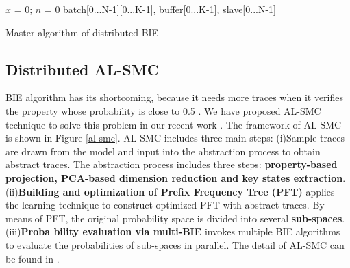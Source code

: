 \begin{algorithm}[t]
{}
$x$ = 0; $n$ = 0\;
batch[0...N-1][0...K-1], buffer[0...K-1], slave[0...N-1]\;
\caption{Master algorithm of distributed BIE}
\label{alg:dbeam}
\end{algorithm}


\subsection{Distributed AL-SMC}
BIE algorithm has its shortcoming, because it needs more traces when it verifies the property whose probability is close to 0.5 \cite{zuliani2013bayesian}. We have proposed AL-SMC technique to solve this problem in our recent work \cite{jiangkaiqiang2016}. The framework of AL-SMC is shown in Figure \ref{al-smc}. AL-SMC includes three main steps: (i)Sample traces are drawn from the model and input into the abstraction process to obtain abstract traces. The abstraction process includes three steps: \textbf{property-based projection, PCA-based dimension reduction \cite{dunteman1989principal} and key states extraction}. (ii)\textbf{Building and optimization of Prefix Frequency Tree (PFT)} applies the learning technique \cite{carrasco1994learning} to construct optimized PFT with abstract traces. By means of PFT, the original probability space is divided into several \textbf{sub-spaces}. (iii)\textbf{Proba
bility evaluation via multi-BIE} invokes multiple BIE algorithms to evaluate the probabilities of sub-spaces in parallel. The detail of AL-SMC can be found in \cite{jiangkaiqiang2016}.

